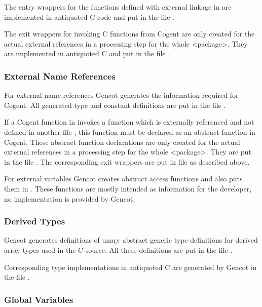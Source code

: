 The entry wrappers for the functions defined with external linkage in  are implemented in antiquoted C code and
put in the file . 

The exit wrappers for invoking C functions from Cogent are only created for the actual
external references in a processing step for the whole <package>. They are implemented in antiquoted C
and put in the file .

\subsubsection{External Name References}

For external name references Gencot generates the information required for Cogent. 
All generated type and constant definitions are put in the file .

If a Cogent function in  invokes a function which is externally referenced and not defined in another
file , this function must be declared as an abstract function in Cogent. These abstract function declarations
are only created for the actual
external references in a processing step for the whole <package>. They are put in the file .
The corresponding exit wrappers are put in file  as described above.

For external variables Gencot creates abstract access functions and also puts them in .
These functions are mostly intended as information for the developer, no implementation is provided by Gencot.

\subsubsection{Derived Types}

Gencot generates definitions of unary abstract generic type definitions for derived array types 
used in the C source. All these definitions are put in the file .

Corresponding type implementations in antiquoted C are generated by Gencot in the file .

\subsubsection{Global Variables}

